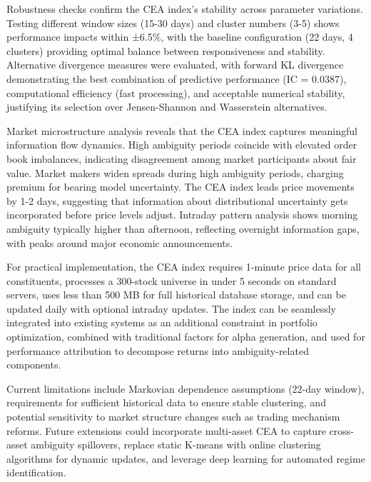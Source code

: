 \documentclass[preprint,12pt,authoryear]{elsarticle}
\begin{document}
Robustness checks confirm the CEA index's stability across parameter variations. Testing different window sizes (15-30 days) and cluster numbers (3-5) shows performance impacts within ±6.5\%, with the baseline configuration (22 days, 4 clusters) providing optimal balance between responsiveness and stability. Alternative divergence measures were evaluated, with forward KL divergence demonstrating the best combination of predictive performance (IC = 0.0387), computational efficiency (fast processing), and acceptable numerical stability, justifying its selection over Jensen-Shannon and Wasserstein alternatives.


Market microstructure analysis reveals that the CEA index captures meaningful information flow dynamics. High ambiguity periods coincide with elevated order book imbalances, indicating disagreement among market participants about fair value. Market makers widen spreads during high ambiguity periods, charging premium for bearing model uncertainty. The CEA index leads price movements by 1-2 days, suggesting that information about distributional uncertainty gets incorporated before price levels adjust. Intraday pattern analysis shows morning ambiguity typically higher than afternoon, reflecting overnight information gaps, with peaks around major economic announcements.

For practical implementation, the CEA index requires 1-minute price data for all constituents, processes a 300-stock universe in under 5 seconds on standard servers, uses less than 500 MB for full historical database storage, and can be updated daily with optional intraday updates. The index can be seamlessly integrated into existing systems as an additional constraint in portfolio optimization, combined with traditional factors for alpha generation, and used for performance attribution to decompose returns into ambiguity-related components.

Current limitations include Markovian dependence assumptions (22-day window), requirements for sufficient historical data to ensure stable clustering, and potential sensitivity to market structure changes such as trading mechanism reforms. Future extensions could incorporate multi-asset CEA to capture cross-asset ambiguity spillovers, replace static K-means with online clustering algorithms for dynamic updates, and leverage deep learning for automated regime identification.
\end{document}
